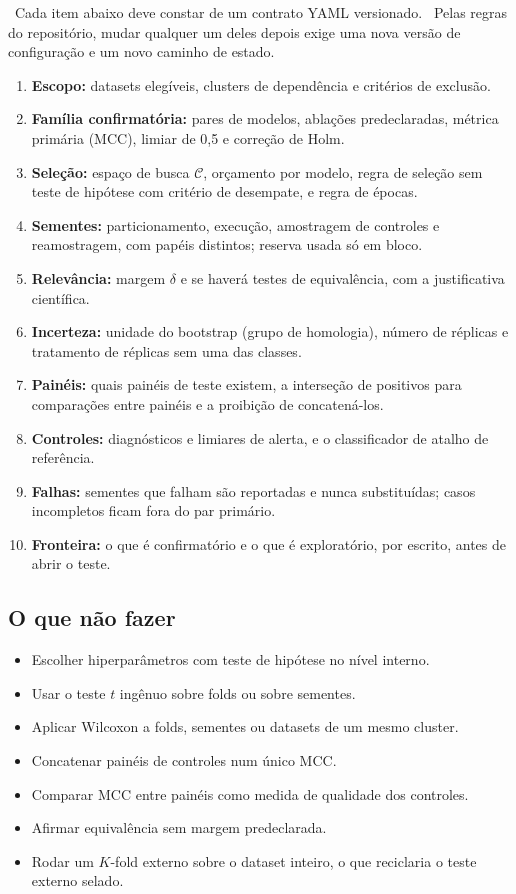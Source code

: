 \documentclass[11pt,a4paper]{article}
\newcommand{\etiqueta}[2]{\tcbox[on line, colback=#1!10, colframe=#1!75!black,
  boxrule=0.4pt, arc=1.2pt, left=1.5pt, right=1.5pt, top=0pt, bottom=0pt,
  fontupper=\sffamily\scriptsize\bfseries]{#2}}
\newcommand{\proj}{\etiqueta{oiGreen}{Projeto}}
\newcommand{\rec}{\etiqueta{oiVerm}{Recomendação}}
\begin{document}
\rec\ Cada item abaixo deve constar de um contrato YAML versionado. \proj\ Pelas regras do repositório, mudar qualquer um deles depois exige uma nova versão de configuração e um novo caminho de estado.

\begin{enumerate}[leftmargin=1.6em]
\item \textbf{Escopo:} datasets elegíveis, clusters de dependência e critérios de exclusão.
\item \textbf{Família confirmatória:} pares de modelos, ablações predeclaradas, métrica primária (MCC), limiar de 0,5 e correção de Holm.
\item \textbf{Seleção:} espaço de busca $\mathcal{C}$, orçamento por modelo, regra de seleção sem teste de hipótese com critério de desempate, e regra de épocas.
\item \textbf{Sementes:} particionamento, execução, amostragem de controles e reamostragem, com papéis distintos; reserva usada só em bloco.
\item \textbf{Relevância:} margem $\delta$ e se haverá testes de equivalência, com a justificativa científica.
\item \textbf{Incerteza:} unidade do bootstrap (grupo de homologia), número de réplicas e tratamento de réplicas sem uma das classes.
\item \textbf{Painéis:} quais painéis de teste existem, a interseção de positivos para comparações entre painéis e a proibição de concatená-los.
\item \textbf{Controles:} diagnósticos e limiares de alerta, e o classificador de atalho de referência.
\item \textbf{Falhas:} sementes que falham são reportadas e nunca substituídas; casos incompletos ficam fora do par primário.
\item \textbf{Fronteira:} o que é confirmatório e o que é exploratório, por escrito, antes de abrir o teste.
\end{enumerate}

\subsection{O que não fazer}
\begin{itemize}[leftmargin=1.4em]
\item Escolher hiperparâmetros com teste de hipótese no nível interno.
\item Usar o teste $t$ ingênuo sobre folds ou sobre sementes.
\item Aplicar Wilcoxon a folds, sementes ou datasets de um mesmo cluster.
\item Concatenar painéis de controles num único MCC.
\item Comparar MCC entre painéis como medida de qualidade dos controles.
\item Afirmar equivalência sem margem predeclarada.
\item Rodar um $K$-fold externo sobre o dataset inteiro, o que reciclaria o teste externo selado.
\end{itemize}
\end{document}
